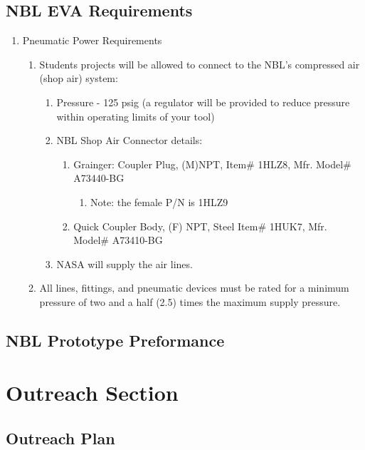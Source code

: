 \documentclass{article}
\begin{document}
\subsection{NBL EVA Requirements}
\begin{enumerate}
    \item Pneumatic Power Requirements
    \begin{enumerate}
        \item Students projects will be allowed to connect to the NBL's compressed air (shop air) system:
        \begin{enumerate}
            \item Pressure - 125 psig (a regulator will be provided to reduce pressure within operating limits of your tool)
            \item NBL Shop Air Connector details:
            \begin{enumerate}
                \item Grainger: Coupler Plug, (M)NPT, Item# 1HLZ8, Mfr. Model# A73440-BG
                \begin{enumerate}
                    \item Note: the female P/N is 1HLZ9
                \end{enumerate}
                \item Quick Coupler Body, (F) NPT, Steel Item# 1HUK7, Mfr. Model# A73410-BG
            \end{enumerate}
            \item NASA will supply the air lines.
        \end{enumerate}
        \item All lines, fittings, and pneumatic devices must be rated for a minimum pressure of two and a half (2.5) times the maximum supply pressure.
    \end{enumerate}
\end{enumerate}
\subsection{NBL Prototype Preformance}


\section{Outreach Section}
\subsection{Outreach Plan}
\end{document}
